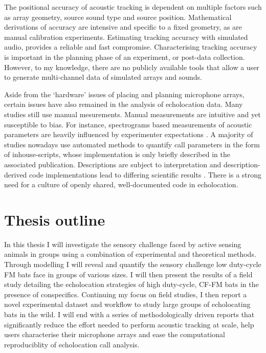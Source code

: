 \documentclass[
]{book}
\begin{document}
The positional accuracy of acoustic tracking is dependent on multiple factors such as array geometry, source sound type and source position. Mathematical derivations of accuracy are intensive and specific to a fixed geometry, as are manual calibration experiments. Estimating tracking accuracy with simulated audio, provides a reliable and fast compromise. Characterising tracking accuracy is important in the planning phase of an experiment, or post-data collection. However, to my knowledge, there are no publicly available tools that allow a user to generate multi-channel data of simulated arrays and sounds.

Aside from the `hardware' issues of placing and planning microphone arrays, certain issues have also remained in the analysis of echolocation data. Many studies still use manual mesurements. Manual measurements are intuitive and yet susceptible to bias. For instance, spectrograms based measurements of acoustic parameters are heavily influenced by experimenter expectations \citep{brumm2017measurement}. A majority of studies nowadays use automated methods to quantify call parameters in the form of inhouse-scripts, whose implementation is only briefly described in the associated publication. Descriptions are subject to interpretation and description-derived code implementations lead to differing scientific results \citep{bakervincent2019, mcfee2018open}. There is a strong need for a culture of openly shared, well-documented code in echolocation.

\hypertarget{thesis-outline}{%
\section{Thesis outline}\label{thesis-outline}}

In this thesis I will investigate the sensory challenge faced by active sensing animals in groups using a combination of experimental and theoretical methods. Through modelling I will reveal and quantify the sensory challenge low duty-cycle FM bats face in groups of various sizes. I will then present the results of a field study detailing the echolocation strategies of high duty-cycle, CF-FM bats in the presence of conspecifics. Continuing my focus on field studies, I then report a novel experimental dataset and workflow to study large groups of echolocating bats in the wild. I will end with a series of methodologically driven reports that significantly reduce the effort needed to perform acoustic tracking at scale, help users characterise their microphone arrays and ease the computational reproduciblity of echolocation call analysis.
\end{document}
